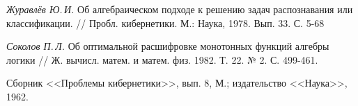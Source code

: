 \documentclass[12pt,a4paper,oneside,fleqn,leqno]{article}
\theoremstyle{definition}
\begin{document}
\begin{thebibliography}{1}
{\it Журавлёв Ю.\,И.}
\newblock Об алгебраическом подходе к решению задач распознавания или классификации. //
\newblock Пробл. кибернетики. М.: Наука, 1978. Вып. 33. С. 5-68


{\it Соколов П.\,Л.}
\newblock Об оптимальной расшифровке монотонных функций алгебры логики //
\newblock Ж. вычисл. матем. и матем. физ. 1982. Т. 22. № 2. С. 499-461.


Сборник <<Проблемы кибернетики>>, вып. 8, М.; издательство <<Наука>>, 1962.\\


\end{thebibliography}
\end{document}
